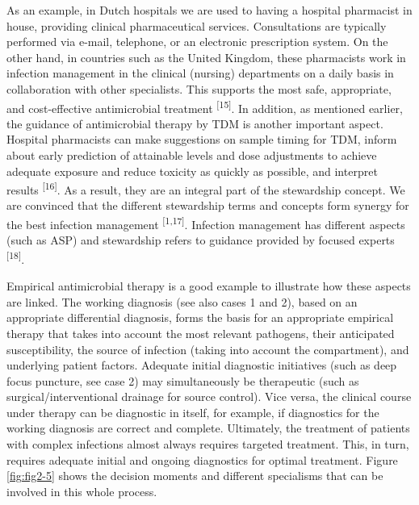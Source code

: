 \documentclass[
]{book}
\begin{document}
As an example, in Dutch hospitals we are used to having a hospital pharmacist in house, providing clinical pharmaceutical services. Consultations are typically performed via e-mail, telephone, or an electronic prescription system. On the other hand, in countries such as the United Kingdom, these pharmacists work in infection management in the clinical (nursing) departments on a daily basis in collaboration with other specialists. This supports the most safe, appropriate, and cost-effective antimicrobial treatment \textsuperscript{{[}15{]}}. In addition, as mentioned earlier, the guidance of antimicrobial therapy by TDM is another important aspect. Hospital pharmacists can make suggestions on sample timing for TDM, inform about early prediction of attainable levels and dose adjustments to achieve adequate exposure and reduce toxicity as quickly as possible, and interpret results \textsuperscript{{[}16{]}}. As a result, they are an integral part of the stewardship concept. We are convinced that the different stewardship terms and concepts form synergy for the best infection management \textsuperscript{{[}1,17{]}}. Infection management has different aspects (such as ASP) and stewardship refers to guidance provided by focused experts \textsuperscript{{[}18{]}}.

Empirical antimicrobial therapy is a good example to illustrate how these aspects are linked. The working diagnosis (see also cases 1 and 2), based on an appropriate differential diagnosis, forms the basis for an appropriate empirical therapy that takes into account the most relevant pathogens, their anticipated susceptibility, the source of infection (taking into account the compartment), and underlying patient factors. Adequate initial diagnostic initiatives (such as deep focus puncture, see case 2) may simultaneously be therapeutic (such as surgical/interventional drainage for source control). Vice versa, the clinical course under therapy can be diagnostic in itself, for example, if diagnostics for the working diagnosis are correct and complete. Ultimately, the treatment of patients with complex infections almost always requires targeted treatment. This, in turn, requires adequate initial and ongoing diagnostics for optimal treatment. Figure \ref{fig:fig2-5} shows the decision moments and different specialisms that can be involved in this whole process.
\end{document}
